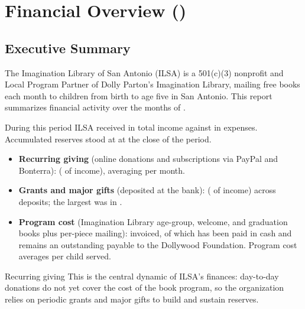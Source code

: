 
\section{Financial Overview (\ilsaPeriod)}

\subsection{Executive Summary}

The Imagination Library of San Antonio (ILSA) is a 501(c)(3) nonprofit and Local
Program Partner of Dolly Parton's Imagination Library, mailing free books each
month to children from birth to age five in San Antonio. This report summarizes
financial activity over the \ilsaNMonths{} months of \ilsaPeriod{}.

During this period ILSA received \ilsaTotalIncome{} in total income against
\ilsaTotalExpense{} in expenses. Accumulated reserves stood at \ilsaReservesEnd{}
at the close of the period.

\begin{itemize}
    \item \textbf{Recurring giving} (online donations and subscriptions via PayPal
          and Bonterra): \ilsaRecurringTotal{} (\ilsaRecurringPct{} of income),
          averaging \ilsaRecurringMonthly{} per month.
    \item \textbf{Grants and major gifts} (deposited at the bank): \ilsaGrantTotal{}
          (\ilsaGrantPct{} of income) across \ilsaGrantCount{} deposits; the largest
          was \ilsaLargestGift{} in \ilsaLargestGiftMonth{}.
    \item \textbf{Program cost} (Imagination Library age-group, welcome, and
          graduation books plus per-piece mailing): \ilsaProgramAccrual{} invoiced,
          of which \ilsaProgramPaid{} has been paid in cash and
          \ilsaProgramPayable{} remains an outstanding payable to the Dollywood
          Foundation. Program cost averages \ilsaCostPerChild{} per child served.
\end{itemize}

Recurring giving \ilsaOpSentence{} This is the central dynamic of ILSA's finances:
day-to-day donations do not yet cover the cost of the book program, so the
organization relies on periodic grants and major gifts to build and sustain
reserves.


